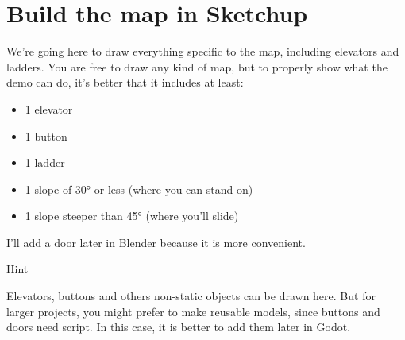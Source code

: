 \documentclass[10pt,a4paper]{article}
\newenvironment{hint}{%
\begin{bclogo}[logo=\bcinfo, couleurBarre=Green, noborder=true, 
               couleur=white]{Hint}
}{%
\end{bclogo}\hspace{1px}\\
}
\begin{document}
\section{Build the map in Sketchup}
We're going here to draw everything specific to the map, including elevators and ladders. You are free to draw any kind of map, but to properly show what the demo can do, it's better that it includes at least:
\begin{itemize}
\item 1 elevator
\item 1 button
\item 1 ladder
\item 1 slope of 30° or less (where you can stand on)
\item 1 slope steeper than 45° (where you'll slide)
\end{itemize}
I'll add a door later in Blender because it is more convenient.

\begin{hint}
Elevators, buttons and others non-static objects can be drawn here. But for larger projects, you might prefer to make reusable models, since buttons and doors need script. In this case, it is better to add them later in Godot.
\end{hint}

\label{sec:sketchup}
\end{document}
